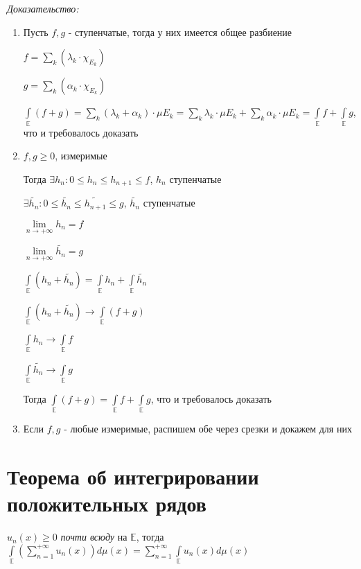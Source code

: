 \documentclass[paper=a4, fontsize=14pt]{report}
\begin{document}
\emph{Доказательство:}

\begin{enumerate}
	\item Пусть $f, g$ - ступенчатые, тогда у них имеется общее разбиение

	$f = \sum\limits_{k}(\lambda_k \cdot \chi_{E_k})$

	$g = \sum\limits_{k}(\alpha_k \cdot \chi_{E_k})$

	$\int\limits_{\mathds{E}} (f + g) = \sum\limits_k (\lambda_k + \alpha_k) \cdot \mu E_k = \sum\limits_k \lambda_k \cdot \mu E_k + \sum\limits_k \alpha_k \cdot \mu E_k = \int\limits_{\mathds{E}} f + \int\limits_{\mathds{E}} g$, что и требовалось доказать

	\item $f, g \geqslant 0$, измеримые

	Тогда $\exists h_n: 0 \leqslant h_n \leqslant h_{n + 1} \leqslant f$, $h_n$ ступенчатые

	$\exists \widetilde{h_n}: 0 \leqslant \widetilde{h_n} \leqslant \widetilde{h_{n + 1}} \leqslant g$, $\widetilde{h_n}$ ступенчатые

	$\lim\limits_{n \rightarrow +\infty} h_n = f$

	$\lim\limits_{n \rightarrow +\infty} \widetilde{h_n} = g$

	$\int\limits_{\mathds{E}} (h_n + \widetilde{h_n}) = \int\limits_{\mathds{E}} h_n + \int\limits_{\mathds{E}} \widetilde{h_n}$

	$\int\limits_{\mathds{E}} (h_n + \widetilde{h_n}) \rightarrow \int\limits_{\mathds{E}} (f + g)$

	$\int\limits_{\mathds{E}} h_n \rightarrow \int\limits_{\mathds{E}} f$

	$\int\limits_{\mathds{E}} \widetilde{h_n} \rightarrow \int\limits_{\mathds{E}} g$

	Тогда $\int\limits_{\mathds{E}} (f + g) = \int\limits_{\mathds{E}} f + \int\limits_{\mathds{E}} g$, что и требовалось доказать

	\item
	Если $f, g$ - любые измеримые, распишем обе через срезки и докажем для них
\end{enumerate}

\section{Теорема об интегрировании положительных рядов}
$u_n(x) \geq 0$ \textit{почти всюду} на $\mathds{E}$, тогда
$\int\limits_{\mathds{E}} (\sum\limits_{n=1}^{+\infty}u_n(x))d\mu(x) =
\sum\limits_{n=1}^{+\infty} \int\limits_{\mathds{E}} u_n(x)d\mu(x)$
\end{document}
